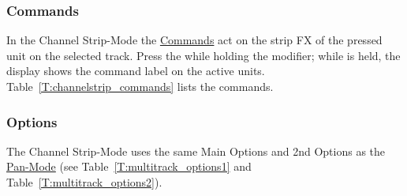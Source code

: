\subsubsection{Commands}\label{channelstripcommands}
In the Channel Strip-Mode the \hyperref[commands]{Commands} act on the strip
FX of the pressed unit on the selected track. Press the \vpot while holding
the \control modifier; while \control is held, the display shows the command
label on the active units. Table~\ref{T:channelstrip_commands} lists the
commands.


\subsubsection{Options}
The Channel Strip-Mode uses the same Main Options and 2nd Options as the
\hyperref[panmode]{Pan-Mode} (see Table~\ref{T:multitrack_options1} and
Table~\ref{T:multitrack_options2}).

